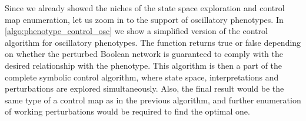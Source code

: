 Since we already showed the niches of the state space exploration and control map enumeration, let us zoom in to the support of oscillatory phenotypes. In \autoref{algo:phenotype_control_osc} we show a simplified version of the control algorithm for oscillatory phenotypes. The function returns true or false depending on whether the perturbed Boolean network is guaranteed to comply with the desired relationship with the phenotype. This algorithm is then a part of the complete symbolic control algorithm, where state space, interpretations and perturbations are explored simultaneously. Also, the final result would be the same type of a control map as in the previous algorithm, and further enumeration of working perturbations would be required to find the optimal one.

  
